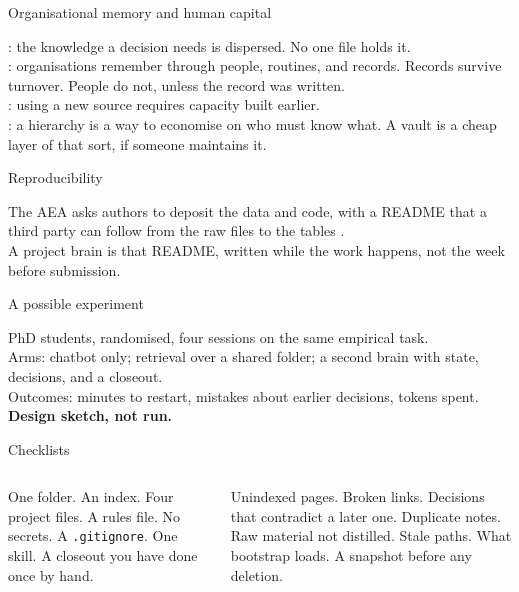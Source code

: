\begin{frame}{Organisational memory and human capital}
  {\small
  \citet{hayek_1945}: the knowledge a decision needs is dispersed. No one file holds it.\\[0.45em]
  \citet{walsh_1991}: organisations remember through people, routines, and records. Records survive turnover. People do not, unless the record was written.\\[0.45em]
  \citet{cohen_1990}: using a new source requires capacity built earlier.\\[0.45em]
  \citet{garicano_2000}: a hierarchy is a way to economise on who must know what. A vault is a cheap layer of that sort, if someone maintains it.\par}
\end{frame}

\begin{frame}{Reproducibility}
  {\small The AEA asks authors to deposit the data and code, with a README that a third party can follow from the raw files to the tables \citep{aea_dcap}.\\[0.5em]
  A project brain is that README, written while the work happens, not the week before submission.\par}
\end{frame}

\begin{frame}{A possible experiment}
  {\small PhD students, randomised, four sessions on the same empirical task.\\[0.4em]
  Arms: chatbot only; retrieval over a shared folder; a second brain with state, decisions, and a closeout.\\[0.4em]
  Outcomes: minutes to restart, mistakes about earlier decisions, tokens spent.\\[0.5em]
  \textbf{\color{ink} Design sketch, not run.}\par}
\end{frame}

\begin{frame}{Checklists}
  \begin{columns}[T,onlytextwidth]
      {\small One folder. An index. Four project files. A rules file. No secrets. A \texttt{.gitignore}. One skill. A closeout you have done once by hand.\par}
      {\small Unindexed pages. Broken links. Decisions that contradict a later one. Duplicate notes. Raw material not distilled. Stale paths. What bootstrap loads. A snapshot before any deletion.\par}
  \end{columns}
\end{frame}

